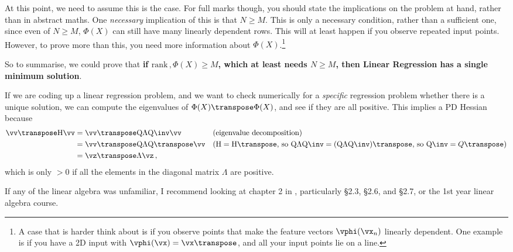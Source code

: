 At this point, we need to assume this is the case. For full marks though, you should state the implications on the problem at hand, rather than in abstract maths. One \emph{necessary} implication of this is that $N\geq M$. This is only a necessary condition, rather than a sufficient one, since even of $N \geq M$, $\Phi(X)$ can still have many linearly dependent rows. This will at least happen if you observe repeated input points. However, to prove more than this, you need more information about $\Phi(X)$.\footnote{A case that is harder think about is if you observe points that make the feature vectors $\vphi(\vx_n)$ linearly dependent. One example is if you have a 2D input with $\vphi(\vx) = \vx\transpose$, and all your input points lie on a line.}

So to summarise, we could prove that \textbf{if $\mathrm{rank}\,, \Phi(X) \geq M$, which at least needs $N\geq M$, then Linear Regression has a single minimum solution}.

If we are coding up a linear regression problem, and we want to check numerically for a \emph{specific} regression problem whether there is a unique solution, we can compute the eigenvalues of $\Phi(X)\transpose\Phi(X)$, and see if they are all positive. This implies a PD Hessian because
\begin{align}
\vv\transpose \mat H \vv &= \vv\transpose \mat Q \mat \Lambda \mat Q\inv \vv && \text{(eigenvalue decomposition)} \\
&= \vv\transpose \mat Q \mat \Lambda \mat Q\transpose\vv && \text{($\mat H = \mat H\transpose$, so $\mat Q\mat \Lambda \mat Q\inv = (\mat Q\mat \Lambda \mat Q\inv)\transpose$, so $\mat Q\inv = Q\transpose$)}\\
&= \vz\transpose \Lambda \vz \,,
\end{align}
which is only $> 0$ if all the elements in the diagonal matrix $\Lambda$ are positive.

If any of the linear algebra was unfamiliar, I recommend looking at chapter 2 in \citet{mml}, particularly \S2.3, \S2.6, and \S2.7, or the 1st year linear algebra course.


